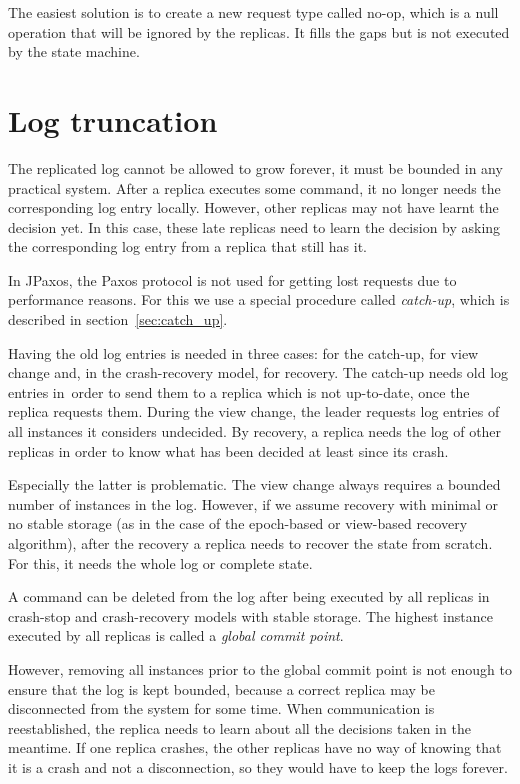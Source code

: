 The easiest solution is to create a new request type called no-op, which is a null operation that will be ignored by the replicas. It fills the gaps but is not executed by the state machine.

\section{Log truncation}

The replicated log cannot be allowed to grow forever, it must be bounded in any practical system. After a replica executes some command, it no longer needs the corresponding log entry locally. However, other replicas may not have learnt the decision yet. \linebreak In this case, these late replicas need to learn the decision by asking the corresponding log entry from a replica that still has it.

In JPaxos, the Paxos protocol is not used for getting lost requests due to performance reasons. For this we use a special procedure called \textit{catch-up}, which is described in section~\ref{sec:catch_up}.

Having the old log entries is needed in three cases: for the catch-up, for view change and, in the crash-recovery model, for recovery.
The catch-up needs old log entries in~order to send them to a replica which is not up-to-date, once the replica requests them.
During the view change, the leader requests log entries of all instances it considers undecided.
By recovery, a replica needs the log of other replicas in order to know what has been decided at least since its crash.

Especially the latter is problematic. The view change always requires a bounded number of instances in the log. However, if we assume recovery with minimal or no stable storage (as in the case of the epoch-based or view-based recovery algorithm), after the recovery a replica needs to recover the state from scratch. For this, it needs the whole log or complete state.


A command can be deleted from the log after being executed by all replicas in crash-stop and crash-recovery models with stable storage. The highest instance executed by all replicas is called a \emph{global commit point}.

However, removing all instances prior to the global commit point is not enough to ensure that the log is kept bounded, because a correct replica may be disconnected from the system for some time. When communication is reestablished, the replica needs to learn about all the decisions taken in the meantime. If one replica crashes, the other replicas have no way of knowing that it is a crash and not a disconnection, so they would have to keep the logs forever.


